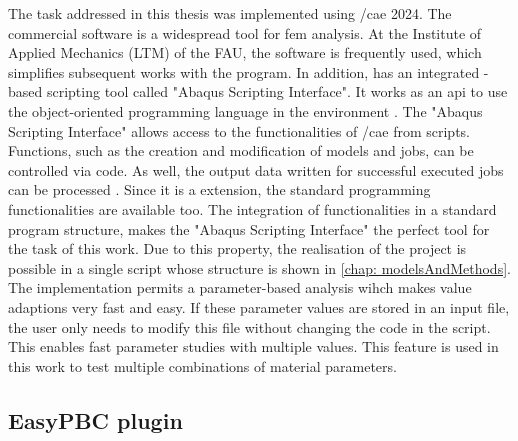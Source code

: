 The task addressed in this thesis was implemented using /\acrshort{cae} 2024. The commercial software is a widespread tool for \acrshort{fem} analysis. At the Institute of Applied Mechanics (LTM) of the FAU, the software is frequently used, which simplifies subsequent works with the program. In addition,  has an integrated -based scripting tool called "Abaqus Scripting Interface". It works as an \acrfull{api} to use the object-oriented programming language  in the  environment \cite{dassault_systems_abaqus_2015-1}. The "Abaqus Scripting Interface" allows access to the functionalities of /\acrshort{cae} from scripts. Functions, such as the creation and modification of models and jobs, can be controlled via code. As well, the output data written for successful executed jobs can be processed \cite{dassault_systems_abaqus_2015-1}. Since it is a  extension, the standard programming functionalities are available too. The integration of  functionalities in a standard program structure, makes the "Abaqus Scripting Interface" the perfect tool for the task of this work. Due to this property, the realisation of the project is possible in a single script whose structure is shown in \autoref{chap: modelsAndMethods}. The implementation permits a parameter-based analysis wihch makes value adaptions very fast and easy. If these parameter values are stored in an input file, the user only needs to modify this file without changing the code in the script. This enables fast parameter studies with multiple values. This feature is used in this work to test multiple combinations of material parameters.  





\subsection{EasyPBC plugin} \label{subsec: EasPBC}

